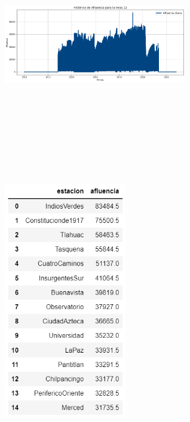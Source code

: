 \documentclass[
]{article}
\begin{document}
\includegraphics[width=0.6\textwidth,height=3.64583in]{Imagenes/Linea12.png}
\includegraphics[width=0.4\textwidth,height=5.20833in]{Imagenes/Tabla_medianas.png}
\end{document}
